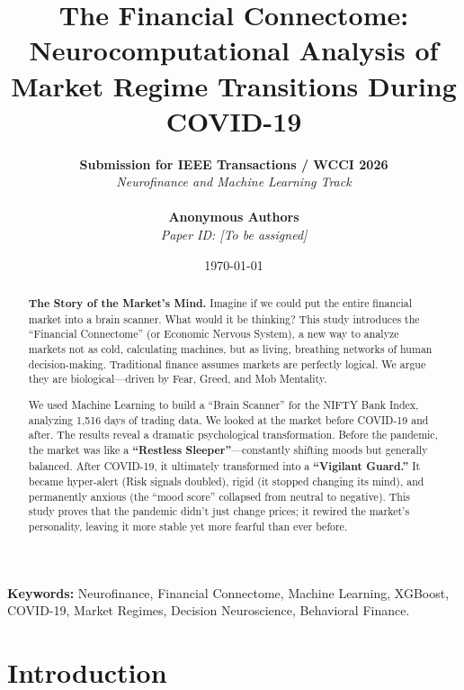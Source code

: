 \documentclass[12pt, oneside]{article}
\begin{document}
\title{\textbf{The Financial Connectome: Neurocomputational Analysis of Market Regime Transitions During COVID-19}}

\author{
    \textbf{Submission for IEEE Transactions / WCCI 2026} \\
    \textit{Neurofinance and Machine Learning Track} \\
    \\
    \textbf{Anonymous Authors} \\
    \textit{Paper ID: [To be assigned]}
}

\date{\today}

\maketitle

\begin{abstract}
\noindent \textbf{The Story of the Market's Mind.} Imagine if we could put the entire financial market into a brain scanner. What would it be thinking? This study introduces the ``Financial Connectome'' (or Economic Nervous System), a new way to analyze markets not as cold, calculating machines, but as living, breathing networks of human decision-making. Traditional finance assumes markets are perfectly logical. We argue they are biological---driven by Fear, Greed, and Mob Mentality. 

We used Machine Learning to build a ``Brain Scanner'' for the NIFTY Bank Index, analyzing 1,516 days of trading data. We looked at the market before COVID-19 and after. The results reveal a dramatic psychological transformation. Before the pandemic, the market was like a \textbf{``Restless Sleeper''}---constantly shifting moods but generally balanced. After COVID-19, it ultimately transformed into a \textbf{``Vigilant Guard.''} It became hyper-alert (Risk signals doubled), rigid (it stopped changing its mind), and permanently anxious (the ``mood score'' collapsed from neutral to negative). This study proves that the pandemic didn't just change prices; it rewired the market's personality, leaving it more stable yet more fearful than ever before.
\end{abstract}

\textbf{Keywords:} Neurofinance, Financial Connectome, Machine Learning, XGBoost, COVID-19, Market Regimes, Decision Neuroscience, Behavioral Finance.

\newpage
\tableofcontents
\newpage

\section{Introduction}
\end{document}
